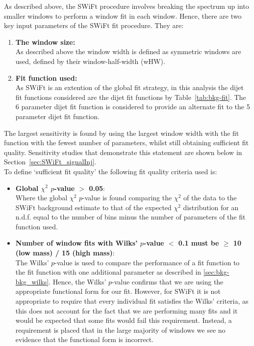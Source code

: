As described above, the SWiFt procedure involves breaking the spectrum up into smaller windows to perform a window fit in each window.
Hence, there are two key input parameters of the SWiFt fit procedure.
\noindent
They are:
\begin{enumerate}
\item \textbf{The window size:}\\
  As described above the window width is defined as symmetric windows are used, defined by their window-half-width (wHW).
\item \textbf{Fit function used:}\\
  As SWiFt is an extention of the global fit strategy,
  in this analysis the dijet fit functions considered are the dijet fit functions by Table~\ref{tab:bkg-fit}.
  The 6 parameter dijet fit function is considered to provide an alternate fit to the 5 parameter dijet fit function.
\end{enumerate}
The largest sensitivity is found by using the largest window width with the fit function with the fewest number of parameters, whilst still obtaining sufficient fit quality.
Sensitivity studies that demonstrate this statement are shown below in Section~\ref{sec:SWiFt_signalInj}.\\

\noindent
To define `sufficient fit quality' the following fit quality criteria used is:
\begin{itemize}
  
\item \textbf{Global $\chi^{2}$ $p$-value $>$ 0.05}:\\
  Where the global $\chi^{2}$ $p$-value is found comparing the $\chi^{2}$ of the data to the SWiFt background estimate
  to that of the expected  $\chi^{2}$ distribution for an n.d.f. equal to the number of bins minus the number of parameters of the fit function used.

\item \textbf{Number of window fits with Wilks' $p$-value $<$ 0.1 must be $\geq$ 10 (low mass) / 15 (high mass)}:\\
  The Wilks' $p$-value is used to compare the performance of a fit function to the fit function with one additional parameter
  as described in \ref{sec:bkg-bkg_wilks}. Hence, the Wilks' $p$-value confirms that we are using the appropriate functional form for our fit.
  However, for SWiFt it is not appropriate to require that every individual fit satisfies the Wilks' criteria,
  as this does not account for the fact that we are performing many fits and it would be expected that some fits would fail this requirement.
  Instead, a requirement is placed that in the large majority of windows we see no evidence that the functional form is incorrect.
\end{itemize}

